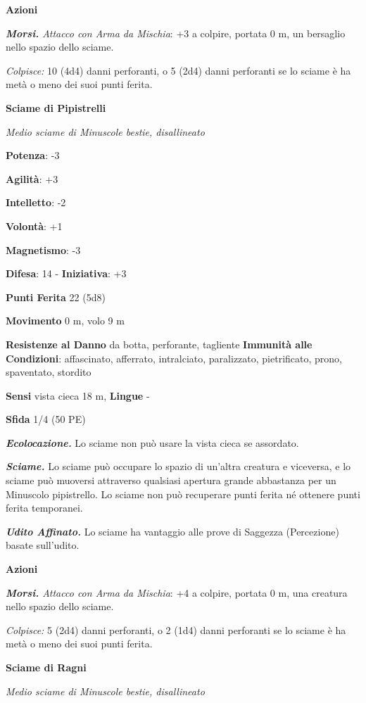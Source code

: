 \begin{multicols}{2}
\smallskip\textbf{Azioni}

\emph{\textbf{Morsi.} Attacco con Arma da Mischia}: +3 a colpire,
portata 0 m, un bersaglio nello spazio dello sciame.

\emph{Colpisce:} 10 (4d4) danni perforanti, o 5 (2d4) danni perforanti
se lo sciame è ha metà o meno dei suoi punti ferita.

\textbf{Sciame di Pipistrelli}

\emph{Medio sciame di Minuscole bestie, disallineato}

\textbf{Potenza}: -3

\textbf{Agilità}: +3

\textbf{Intelletto}: -2

\textbf{Volontà}: +1

\textbf{Magnetismo}: -3

\textbf{Difesa}: 14 - \textbf{Iniziativa}: +3

\textbf{Punti Ferita} 22 (5d8)

\textbf{Movimento} 0 m, volo 9 m

\textbf{Resistenze al Danno} da botta, perforante, tagliente
\textbf{Immunità alle Condizioni}: affascinato, afferrato, intralciato,
paralizzato, pietrificato, prono, spaventato, stordito

\textbf{Sensi} vista cieca 18 m,  \textbf{Lingue} -

\textbf{Sfida} 1/4 (50 PE)\smallskip

\emph{\textbf{Ecolocazione.}} Lo sciame non può usare la vista cieca se
assordato.

\emph{\textbf{Sciame.}} Lo sciame può occupare lo spazio di un'altra
creatura e viceversa, e lo sciame può muoversi attraverso qualsiasi
apertura grande abbastanza per un Minuscolo pipistrello. Lo sciame non
può recuperare punti ferita né ottenere punti ferita temporanei.

\emph{\textbf{Udito Affinato.}} Lo sciame ha vantaggio alle prove di
Saggezza (Percezione) basate sull'udito.

\smallskip\textbf{Azioni}

\emph{\textbf{Morsi.} Attacco con Arma da Mischia}: +4 a colpire,
portata 0 m, una creatura nello spazio dello sciame.

\emph{Colpisce:} 5 (2d4) danni perforanti, o 2 (1d4) danni perforanti se
lo sciame è ha metà o meno dei suoi punti ferita.

\textbf{Sciame di Ragni}

\emph{Medio sciame di Minuscole bestie, disallineato}


\end{multicols}
